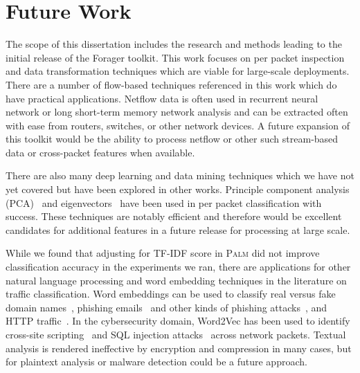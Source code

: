 \section{Future Work}
The scope of this dissertation includes the research and methods leading to the initial release of the Forager toolkit. This work focuses on per packet inspection and data transformation techniques which are viable for large-scale deployments. There are a number of flow-based techniques referenced in this work which do have practical applications. Netflow data is often used in recurrent neural network or long short-term memory network analysis and can be extracted often with ease from routers, switches, or other network devices. A future expansion of this toolkit would be the ability to process netflow or other such stream-based data or cross-packet features when available.

There are also many deep learning and data mining techniques which we have not yet covered but have been explored in other works. Principle component analysis (PCA)~\cite{Yan2014Principal, Nilesh2021machine} and eigenvectors~\cite{Qing2021Encrypted} have been used in per packet classification with success. These techniques are notably efficient and therefore would be excellent candidates for additional features in a future release for processing at large scale.

While we found that adjusting for TF-IDF score in \textsc{Palm} did not improve classification accuracy in the experiments we ran, there are applications for other natural language processing and word embedding techniques in the literature on traffic classification. Word embeddings can be used to classify real versus fake domain names~\cite{Vinayakumar2020visualized}, phishing emails~\cite{rao2022application,  yuan2018url2vec, tajaddodianfar2020texception} and other kinds of phishing attacks~\cite{somesha2022classification}, and HTTP traffic~\cite{gniewkowski2021http2vec}. In the cybersecurity domain, Word2Vec has been used to identify cross-site scripting~\cite{fang2018deepxss, guichang2019cnnpayl} and SQL injection attacks~\cite{yu2019detecting} across network packets. Textual analysis is rendered ineffective by encryption and compression in many cases, but for plaintext analysis or malware detection could be a future approach.

